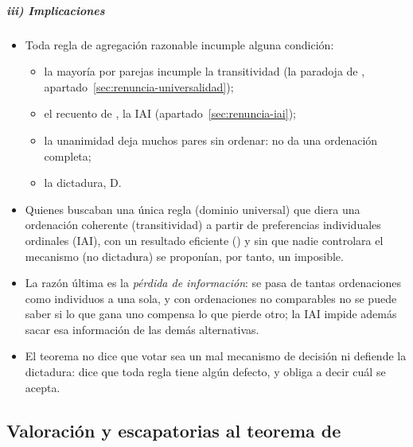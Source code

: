 \documentclass[11pt]{article}
\begin{document}
\subparagraph{iii) Implicaciones}

\begin{itemize}
\item Toda regla de agregación razonable incumple alguna condición:
  \begin{itemize}
  \item la mayoría por parejas incumple la transitividad (la paradoja de , apartado~\ref{sec:renuncia-universalidad});
  \item el recuento de , la IAI (apartado~\ref{sec:renuncia-iai});
  \item la unanimidad deja muchos pares sin ordenar: no da una ordenación completa;
  \item la dictadura, D.
  \end{itemize}
\item Quienes buscaban una única regla (dominio universal) que diera una ordenación coherente (transitividad) a partir de preferencias individuales ordinales (IAI), con un resultado eficiente () y sin que nadie controlara el mecanismo (no dictadura) se proponían, por tanto, un imposible.
\item La razón última es la \emph{pérdida de información}: se pasa de tantas ordenaciones como individuos a una sola, y con ordenaciones no comparables no se puede saber si lo que gana uno compensa lo que pierde otro; la IAI impide además sacar esa información de las demás alternativas.
\item El teorema no dice que votar sea un mal mecanismo de decisión ni defiende la dictadura: dice que toda regla tiene algún defecto, y obliga a decir cuál se acepta.
\end{itemize}

\subsection{Valoración y escapatorias al teorema de }\label{sec:valoracion-arrow}
\end{document}
